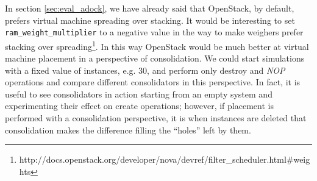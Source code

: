 In section \ref{sec:eval_adock}, we have already said that OpenStack, by default, prefers virtual machine spreading over stacking. It would be interesting to set \texttt{ram\_weight\_multiplier} to a negative value in the way to make weighers prefer stacking over spreading\footnote{http://docs.openstack.org/developer/nova/devref/filter\_scheduler.html\#weights}. In this way OpenStack would be much better at virtual machine placement in a perspective of consolidation. We could start simulations with a fixed value of instances, e.g. $30$, and perform only destroy and \textit{NOP} operations and compare different consolidators in this perspective. In fact, it is useful to see consolidators in action starting from an empty system and experimenting their effect on create operations; however, if placement is performed with a consolidation perspective, it is when instances are deleted that consolidation makes the difference filling the ``holes'' left by them.